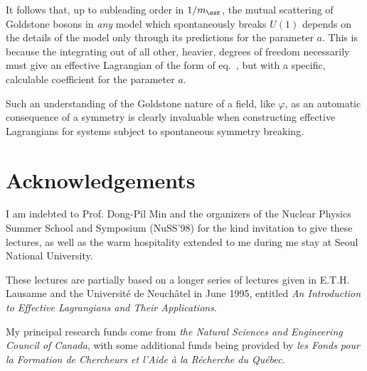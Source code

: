 \documentclass[12pt]{article}
\begin{document}
It follows that, up to subleading order in $1/m_\ssr$, the 
mutual scattering of Goldstone bosons in {\sl any}
model which spontaneously breaks $U(1)$ depends on the
details of the model only through its predictions for the
parameter $a$. This is because the integrating out of all
other, heavier, degrees of freedom necessarily must give
an effective Lagrangian of the form of eq.~, but
with a specific, calculable coefficient for the parameter $a$. 


Such an understanding of the Goldstone nature of a field, like $\varphi$, as
an automatic consequence of a symmetry is clearly invaluable when constructing
effective Lagrangians for systems subject to spontaneous symmetry breaking.


\section*{Acknowledgements}
I am indebted to Prof. Dong-Pil Min and the organizers of
the Nuclear Physics Summer School and Symposium (NuSS'98) 
for the kind invitation to give these lectures, as well as the warm
hospitality extended to me during me stay at Seoul National University.

These lectures are partially based on a longer series of lectures
given in E.T.H. Lausanne and the Universit\'e de
Neuch\^atel in June 1995, entitled 
{\it An Introduction to Effective Lagrangians and Their Applications}. 

My principal research funds come from {\sl the Natural Sciences and 
Engineering Council of Canada}, with some additional funds 
being provided by {\sl les Fonds pour la Formation de Chercheurs 
et l'Aide \`a la R\'echerche du Qu\'ebec}. 


\end{document}

